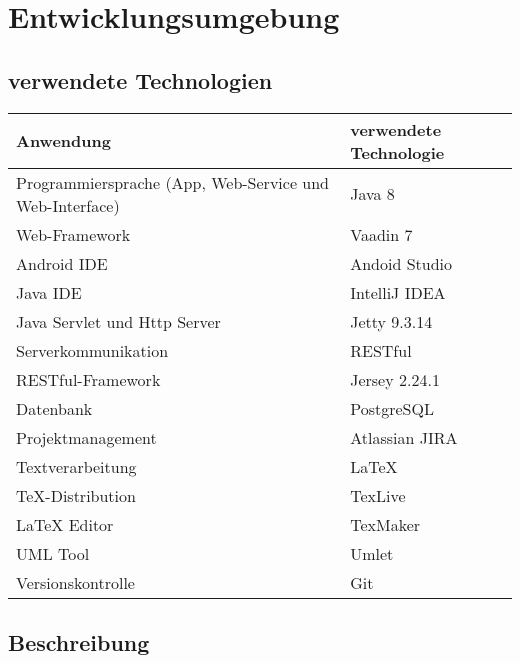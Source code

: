 \chapter{Entwicklungsumgebung}

\section{verwendete Technologien}

\begin{flushleft}
\begin{tabularx} {\textwidth}{|X|X|} \hline
\rowcolor[HTML]{C0C0C0} \textbf{Anwendung} & \textbf{verwendete Technologie} \\ \hline
Programmiersprache (App, Web-Service und Web-Interface) & Java 8 \\ \hline
Web-Framework & Vaadin 7 \\ \hline
Android IDE & Andoid Studio \\ \hline
Java IDE & IntelliJ IDEA \\ \hline
Java Servlet und Http Server & Jetty 9.3.14 \\ \hline
Serverkommunikation & RESTful \\ \hline
RESTful-Framework & Jersey 2.24.1 \\ \hline
Datenbank & PostgreSQL \\ \hline
Projektmanagement & Atlassian JIRA \\ \hline
Textverarbeitung & LaTeX \\ \hline
TeX-Distribution & TexLive \\ \hline
LaTeX Editor & TexMaker \\ \hline
UML Tool & Umlet \\ \hline
Versionskontrolle & Git \\ \hline
\end{tabularx}
\end{flushleft}

\section{Beschreibung}

